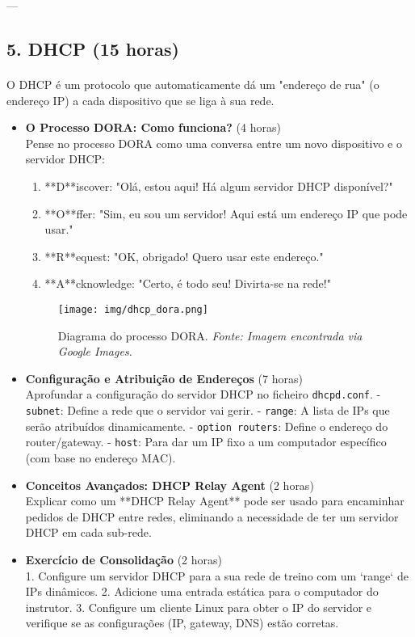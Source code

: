 \documentclass[10pt,a4paper]{article}
\begin{document}
	---
	
	\subsection*{5. DHCP (15 horas)}
	\vspace{-1.2em}
	\paragraph{}
	O DHCP é um protocolo que automaticamente dá um "endereço de rua" (o endereço IP) a cada dispositivo que se liga à sua rede.
	
	\begin{itemize}
		\item \textbf{O Processo DORA: Como funciona?} (4 horas) \\
		Pense no processo DORA como uma conversa entre um novo dispositivo e o servidor DHCP:
		\begin{enumerate}
			\item **D**iscover: "Olá, estou aqui! Há algum servidor DHCP disponível?"
			\item **O**ffer: "Sim, eu sou um servidor! Aqui está um endereço IP que pode usar."
			\item **R**equest: "OK, obrigado! Quero usar este endereço."
			\item **A**cknowledge: "Certo, é todo seu! Divirta-se na rede!"
		\end{enumerate}
		
		\begin{figure}[h]
			\centering
			\texttt{[image: img/dhcp\_dora.png]}
			\caption{Diagrama do processo DORA. \textit{Fonte: Imagem encontrada via Google Images.}}
			\label{fig:dhcp_dora}
		\end{figure}
		
		\item \textbf{Configuração e Atribuição de Endereços} (7 horas) \\
		Aprofundar a configuração do servidor DHCP no ficheiro \texttt{dhcpd.conf}.
		- \texttt{subnet}: Define a rede que o servidor vai gerir.
		- \texttt{range}: A lista de IPs que serão atribuídos dinamicamente.
		- \texttt{option routers}: Define o endereço do router/gateway.
		- \texttt{host}: Para dar um IP fixo a um computador específico (com base no endereço MAC).
		
		\item \textbf{Conceitos Avançados: DHCP Relay Agent} (2 horas) \\
		Explicar como um **DHCP Relay Agent** pode ser usado para encaminhar pedidos de DHCP entre redes, eliminando a necessidade de ter um servidor DHCP em cada sub-rede.
		
		\item \textbf{Exercício de Consolidação} (2 horas) \\
		1. Configure um servidor DHCP para a sua rede de treino com um `range` de IPs dinâmicos.
		2. Adicione uma entrada estática para o computador do instrutor.
		3. Configure um cliente Linux para obter o IP do servidor e verifique se as configurações (IP, gateway, DNS) estão corretas.
	\end{itemize}
	
\end{document}
